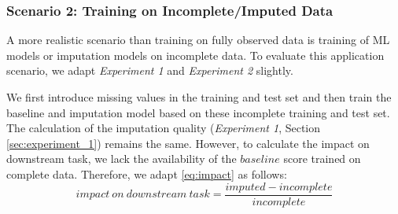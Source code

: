\subsubsection{Scenario 2: Training on Incomplete/Imputed Data}
\label{sec:scenario_2}
%
A more realistic scenario than training on fully observed data is training of ML models or imputation models on incomplete data. To evaluate this application scenario, we adapt \emph{Experiment 1} and \emph{Experiment 2} slightly.

We first introduce missing values in the training and test set and then train the baseline and imputation model based on these incomplete training and test set. The calculation of the imputation quality (\emph{Experiment 1}, Section \ref{sec:experiment_1}) remains the same. However, to calculate the impact on downstream task, we lack the availability of the $baseline$ score trained on complete data. Therefore, we adapt \autoref{eq:impact} as follows:
%
\begin{equation}
	impact\ on \ downstream\ task = \frac{imputed - incomplete}{incomplete}
	\label{eq:impact_scenario2}
\end{equation}
%
